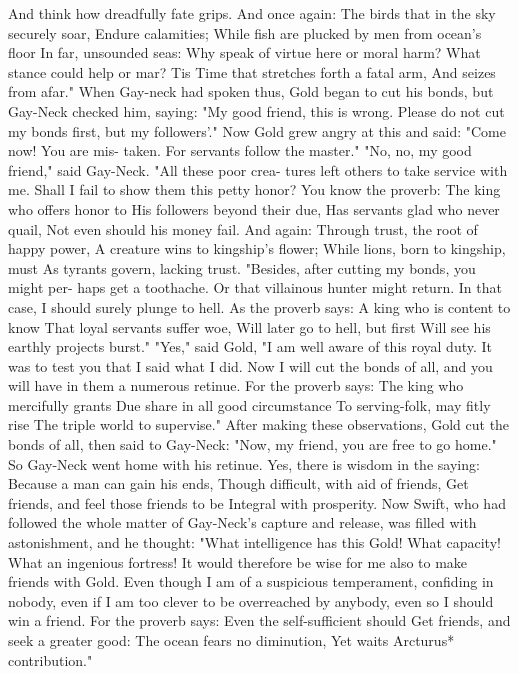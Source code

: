 \documentclass{book}
\begin{document}
And think how dreadfully fate grips.
And once again:
The birds that in the sky securely soar,
Endure calamities;
While fish are plucked by men from ocean's floor
In far, unsounded seas:
Why speak of virtue here or moral harm?
What stance could help or mar?
Tis Time that stretches forth a fatal arm,
And seizes from afar."
When Gay-neck had spoken thus, Gold began to
cut his bonds, but Gay-Neck checked him, saying:
"My good friend, this is wrong. Please do not cut my
bonds first, but my followers'." Now Gold grew
angry at this and said: "Come now! You are mis-
taken. For servants follow the master." "No, no, my
good friend," said Gay-Neck. "All these poor crea-
tures left others to take service with me. Shall I fail
to show them this petty honor? You know the
proverb:
The king who offers honor to
His followers beyond their due,
Has servants glad who never quail,
Not even should his money fail.
And again:
Through trust, the root of happy power,
A creature wins to kingship's flower;
While lions, born to kingship, must
As tyrants govern, lacking trust.
"Besides, after cutting my bonds, you might per-
haps get a toothache. Or that villainous hunter might
return. In that case, I should surely plunge to hell.
As the proverb says:
A king who is content to know
That loyal servants suffer woe,
Will later go to hell, but first
Will see his earthly projects burst."
"Yes," said Gold, "I am well aware of this royal
duty. It was to test you that I said what I did. Now
I will cut the bonds of all, and you will have in them
a numerous retinue. For the proverb says:
The king who mercifully grants
Due share in all good circumstance
To serving-folk, may fitly rise
The triple world to supervise."
After making these observations, Gold cut the
bonds of all, then said to Gay-Neck: "Now, my
friend, you are free to go home." So Gay-Neck went
home with his retinue. Yes, there is wisdom in the
saying:
Because a man can gain his ends,
Though difficult, with aid of friends,
Get friends, and feel those friends to be
Integral with prosperity.
Now Swift, who had followed the whole matter
of Gay-Neck's capture and release, was filled with
astonishment, and he thought: "What intelligence
has this Gold! What capacity! What an ingenious
fortress! It would therefore be wise for me also to
make friends with Gold. Even though I am of a
suspicious temperament, confiding in nobody, even if
I am too clever to be overreached by anybody, even
so I should win a friend. For the proverb says:
Even the self-sufficient should
Get friends, and seek a greater good:
The ocean fears no diminution,
Yet waits Arcturus* contribution."
\end{document}

